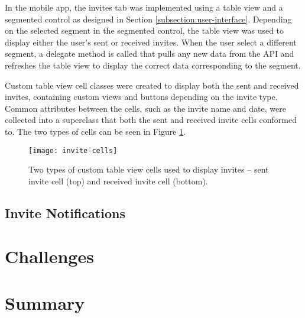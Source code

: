 In the mobile app, the invites tab was implemented using a table view and a segmented control as designed in Section \ref{subsection:user-interface}. Depending on the selected segment in the segmented control, the table view was used to display either the user's sent or received invites. When the user select a different segment, a delegate method is called that pulls any new data from the API and refreshes the table view to display the correct data corresponding to the segment.

Custom table view cell classes were created to display both the sent and received invites, containing custom views and buttons depending on the invite type. Common attributes between the cells, such as the invite name and date, were collected into a superclass that both the sent and received invite cells conformed to. The two types of cells can be seen in Figure \ref{fig:invite-cells}.

\begin{figure}[hbt]
  \centering
  \texttt{[image: invite-cells]}
  \caption{Two types of custom table view cells used to display invites -- sent invite cell (top) and received invite cell (bottom).}
  \label{fig:invite-cells}
\end{figure}

\subsection{Invite Notifications}


\section{Challenges}


\section{Summary}


